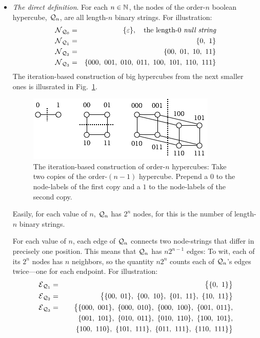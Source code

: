 \begin{itemize}
\item
{\it The direct definition}.
For each $n \in \mathbb{N}$, the nodes of the order-$n$ boolean hypercube,
$\mbox{$\cal Q$}_n$, are all length-$n$ binary strings.  For illustration:
\begin{eqnarray*}
\mbox{$\cal N$}_{{\mbox{{\scriptsize $\cal Q$}}}_0}
  & = & 
\{ \varepsilon \}, \ \ \mbox{ the length-$0$ {\em null string}} \\ 
\mbox{$\cal N$}_{{\mbox{{\scriptsize $\cal Q$}}}_1}
  & = &
\{ 0, \ 1 \} \\
\mbox{$\cal N$}_{{\mbox{{\scriptsize $\cal Q$}}}_2}
  & = & \{ 00, \ 01, \ 10, \ 11 \} \\
\mbox{$\cal N$}_{{\mbox{{\scriptsize $\cal Q$}}}_3}
  & = & \{ 000, \ 001, \ 010, \ 011, \ 100, \ 101, \ 110, \ 111 \} 
\end{eqnarray*}
The iteration-based construction of big hypercubes from the next
smaller ones is illusrated in Fig.~\ref{fig:hypercube}.
\begin{figure}[hbt]
\begin{center}
       \includegraphics[scale=0.6]{FiguresGraph/hypercube}
\caption{The iteration-based construction of order-$n$ hypercubes:
  Take two copies of the order-$(n-1)$ hypercube.  Prepend a $0$ to
  the node-labels of the first copy and a $1$ to the node-labels of
  the second copy.}
  \label{fig:hypercube}
\end{center}
\end{figure}

Easily, for each value of $n$, $\mbox{$\cal Q$}_n$ has $2^n$ nodes, for this is the
number of length-$n$ binary strings.

\medskip

For each value of $n$, each edge of $\mbox{$\cal Q$}_n$ connects two node-strings
that differ in precisely one position.  This means that $\mbox{$\cal Q$}_n$ has $n
2^{n-1}$ edges: To wit, each of its $2^n$ nodes has $n$ neighbors, so
the quantity $n 2^n$ counts each of $\mbox{$\cal Q$}_n$'s edges twice---one for
each endpoint.  For illustration:
\begin{eqnarray*}
\mbox{$\cal E$}_{{\mbox{{\scriptsize $\cal Q$}}}_1}
  & = &
\big\{ \{ 0, \ 1 \} \big\} \\
\mbox{$\cal E$}_{{\mbox{{\scriptsize $\cal Q$}}}_2}
  & = & \big\{
\{ 00, \ 01 \}, \ \{ 00, \ 10\}, \
\{ 01, \ 11 \}, \ \{ 10, \ 11\} 
\big\} \\
\mbox{$\cal E$}_{{\mbox{{\scriptsize $\cal Q$}}}_3}
  & = & \big\{ 
\{000, \ 001\}, \
\{000, \ 010\}, \
\{000, \ 100\}, \
\{001, \ 011\}, \\
  &  & \hspace*{.2in}
\{001, \ 101\}, \
\{010, \ 011\}, \
\{010, \ 110\}, \
\{100, \ 101\}, \\
  &  & \hspace*{.2in}
\{100, \ 110\}, \
\{101, \ 111\}, \
\{011, \ 111\}, \
\{110, \ 111\}
\big\}
\end{eqnarray*}
\end{itemize}

